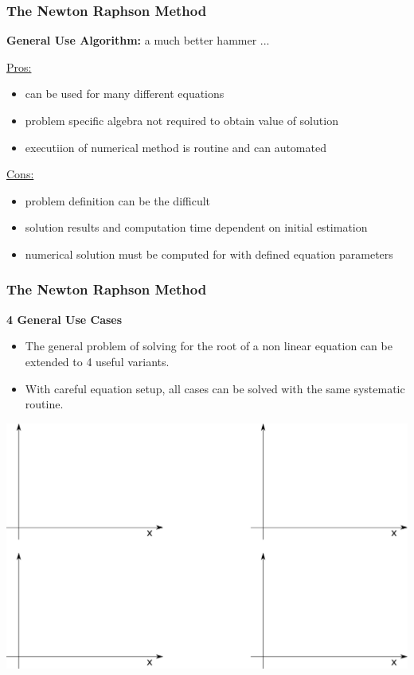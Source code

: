 \documentclass[fleqn]{beamer} %
\newcommand{\sectionIIsubsectionIIItitle}{The Newton Raphson Method}
\begin{document}
			\begin{frame}
				\frametitle{\sectionIIsubsectionIIItitle}\small
				\bigskip

				\textbf{General Use Algorithm:} a much better hammer ...\vspcc

				\underline{Pros:}
				\begin{itemize}
			    	\item can be used for many different equations
			    	\item problem specific algebra not required to obtain value of solution 
			    	\item executiion of numerical method is routine and can automated
				\end{itemize} 

				\underline{Cons:}
				\begin{itemize}
					\item problem definition can be the difficult
					\item solution results and computation time dependent on initial estimation 
					\item numerical solution must be computed for with defined equation parameters
				\end{itemize}

				\btVFill 
			\end{frame}

			\begin{frame}
				\frametitle{\sectionIIsubsectionIIItitle} \scriptsize
				\bigskip
				
				\textbf{4 General Use Cases}
				\begin{itemize}
					\item The general problem of solving for the root of a non linear equation can be extended to 4 useful 
					variants. 
					\item With careful equation setup, all cases can be solved with the same systematic routine. 	
				\end{itemize}	
				\includegraphics[scale=.3]{images/topic3_fig2.png}			
			
				\btVFill 
			\end{frame}
\end{document}
